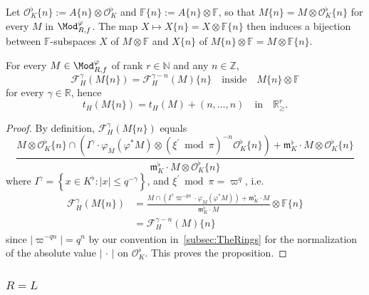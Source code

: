 Let $\mathcal{O}_{K}^{\flat}\{n\}:=A\{n\}\otimes\mathcal{O}_{K}^{\flat}$ and $\mathbb{F}\{n\}:=A\{n\}\otimes\mathbb{F}$, so that $M\{n\}=M\otimes\mathcal{O}_{K}^{\flat}\{n\}$ for every $M$ in $\Mod_{R,f}^{\varphi}$. The map $X\mapsto X\{n\}=X\otimes\mathbb{F}\{n\}$ then induces a bijection between $\mathbb{F}$-subspaces $X$ of $M\otimes\mathbb{F}$ and $X\{n\}$ of $M\{n\}\otimes\mathbb{F}=M\otimes\mathbb{F}\{n\}$.

\begin{prop}\label{prop:tH(twist)4O_K^flat}
For every $M\in\Mod_{R,f}^{\varphi}$ of rank $r\in\mathbb{N}$ and any $n\in\mathbb{Z}$,
\[
\mathcal{F}_{H}^{\gamma}(M\{n\})=\mathcal{F}_{H}^{\gamma-n}(M)\{n\}\quad\text{inside}\quad M\{n\}\otimes\mathbb{F}
\]
for every $\gamma\in\mathbb{R}$, hence
\[
t_{H}(M\{n\})=t_{H}(M)+(n,\dots,n)\quad\text{in}\quad\mathbb{R}_{\geq}^{r}.
\]
\end{prop}
\begin{proof}
By definition, $\mathcal{F}_{H}^{\gamma}(M\{n\})$ equals
\[
\frac{M\otimes\mathcal{O}_{K}^{\flat}\{n\}\cap\left(I^{\gamma}\cdot\varphi_{M}\left(\varphi^{\ast}M\right)\otimes(\xi^{\prime}\bmod\pi)^{-n}\mathcal{O}_{K}^{\flat}\{n\}\right)+\mathfrak{m}_{K}^{\flat}\cdot M\otimes\mathcal{O}_{K}^{\flat}\{n\}}{\mathfrak{m}_{K}^{\flat}\cdot M\otimes\mathcal{O}_{K}^{\flat}\{n\}}
\]
where $I^{\gamma}=\left\{ x\in K^{\flat}:\left|x\right|\leq q^{-\gamma}\right\} $, and $\xi^{\prime}\bmod\pi=\varpi^{q}$, i.e.
\begin{align*}
\mathcal{F}_{H}^{\gamma}(M\{n\}) & = \frac{M\cap\left(I^{\gamma}\varpi^{-qn}\cdot\varphi_{M}\left(\varphi^{\ast}M\right)\right)+\mathfrak{m}_{K}^{\flat}\cdot M}{\mathfrak{m}_{K}^{\flat}\cdot M}\otimes\mathbb{F}\{n\}\\
& = \mathcal{F}_{H}^{\gamma-n}(M)\{n\}
\end{align*}
since $\left|\varpi^{-qn}\right|=q^{n}$ by our convention in~\ref{subsec:TheRings} for the normalization of the absolute value $|{\,\cdot\,}|$ on $\mathcal{O}_{K}^{\flat}$. This proves the proposition.
\end{proof}

\subsubsection{\texorpdfstring{$R=L$}{R=L}}\label{subsec:RisL}

